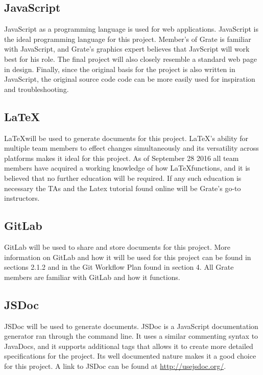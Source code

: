 \documentclass{article}
\begin{document}
\subsection{JavaScript}

JavaScript as a programming language is used for web applications. JavaScript is 
the ideal programming language for this project. Member's of Grate is familiar 
with JavaScript, and \textcolor{RoyalPurple}{Grate's} graphics 
expert believes that JavScript will work best for his role. The final project 
will also closely 
resemble a standard web page in design. Finally, since the original basis for 
the 
project is also written in JavaScript, the original source code code can be more 
easily used for 
inspiration and troubleshooting.

\subsection{\LaTeX}

\LaTeX will be used to generate documents for this project. \LaTeX's ability for 
multiple team members to effect changes simultaneously and its versatility 
across platforms makes it ideal for this project. As of September 28 2016 all 
team members have acquired a working knowledge of how \LaTeX functions, and it 
is 
believed that no further education will be required. If any such education is 
necessary the TAs and the Latex tutorial found online will be 
\textcolor{RoyalPurple}{Grate's} go-to 
instructors. 

\subsection{GitLab}

GitLab will be used to share and store documents for this project. More 
information on GitLab and how it will be used for this project can be found in 
sections 2.1.2 and in the Git Workflow Plan found in section 4. All Grate 
members are familiar with GitLab and how it functions. 

\subsection{JSDoc}
\textcolor{RoyalPurple}{JSDoc will be used to generate documents. JSDoc is a 
JavaScript documentation 
generator ran through the command line. It uses a similar commenting syntax to 
JavaDocs, and it supports additional tags that allows it to create more detailed 
specifications for the project. Its well documented nature 
makes it a good choice for this project. A link to JSDoc can be found at
\url{http://usejsdoc.org/}.}
\end{document}
